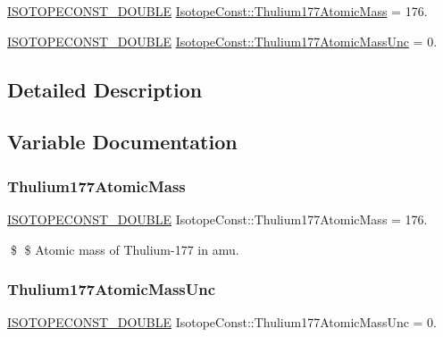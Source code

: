 \begin{DoxyCompactItemize}
\item 
\mbox{\hyperlink{group___isotope_const-_macros_ga8f45a7272ce02c0b4c65c44636ed719a}{I\+S\+O\+T\+O\+P\+E\+C\+O\+N\+S\+T\+\_\+\+D\+O\+U\+B\+LE}} \mbox{\hyperlink{group___isotope_const-_thulium-_tm177_gade5b414fbbc2f0a76f9c9c2da6aa514a}{Isotope\+Const\+::\+Thulium177\+Atomic\+Mass}} = 176.
\item 
\mbox{\hyperlink{group___isotope_const-_macros_ga8f45a7272ce02c0b4c65c44636ed719a}{I\+S\+O\+T\+O\+P\+E\+C\+O\+N\+S\+T\+\_\+\+D\+O\+U\+B\+LE}} \mbox{\hyperlink{group___isotope_const-_thulium-_tm177_gabcd9ecd6f4f02d384efee5cfc8d13b5b}{Isotope\+Const\+::\+Thulium177\+Atomic\+Mass\+Unc}} = 0.
\end{DoxyCompactItemize}


\subsection{Detailed Description}


\subsection{Variable Documentation}
\mbox{\label{group___isotope_const-_thulium-_tm177_gade5b414fbbc2f0a76f9c9c2da6aa514a}} 
\subsubsection{\texorpdfstring{Thulium177\+Atomic\+Mass}{Thulium177AtomicMass}}
{\footnotesize\ttfamily \mbox{\hyperlink{group___isotope_const-_macros_ga8f45a7272ce02c0b4c65c44636ed719a}{I\+S\+O\+T\+O\+P\+E\+C\+O\+N\+S\+T\+\_\+\+D\+O\+U\+B\+LE}} Isotope\+Const\+::\+Thulium177\+Atomic\+Mass = 176.}

\$ \$ Atomic mass of Thulium-\/177 in amu. \mbox{\label{group___isotope_const-_thulium-_tm177_gabcd9ecd6f4f02d384efee5cfc8d13b5b}} 
\subsubsection{\texorpdfstring{Thulium177\+Atomic\+Mass\+Unc}{Thulium177AtomicMassUnc}}
{\footnotesize\ttfamily \mbox{\hyperlink{group___isotope_const-_macros_ga8f45a7272ce02c0b4c65c44636ed719a}{I\+S\+O\+T\+O\+P\+E\+C\+O\+N\+S\+T\+\_\+\+D\+O\+U\+B\+LE}} Isotope\+Const\+::\+Thulium177\+Atomic\+Mass\+Unc = 0.}

